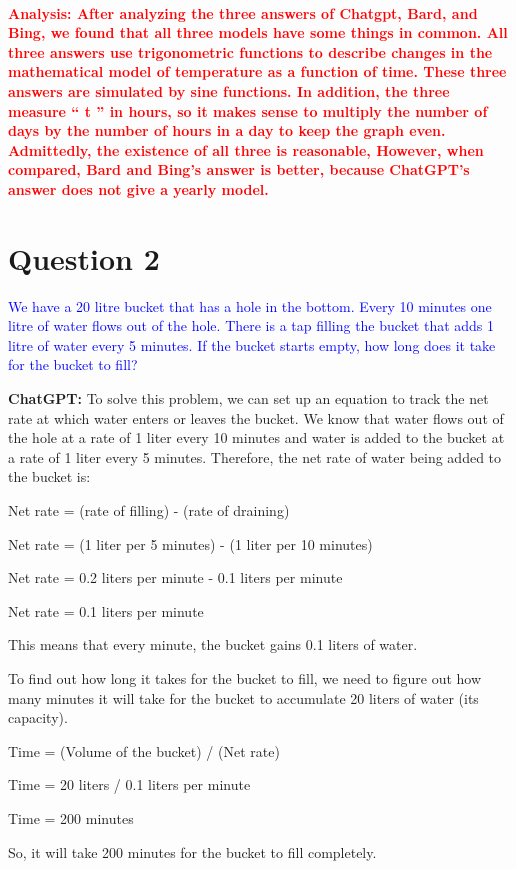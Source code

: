 \documentclass[11pt]{article} %
\begin{document}
\paragraph{\textcolor{red}{Analysis: After analyzing the three answers of Chatgpt, Bard, and Bing, we found that all three models have some things in common. All three answers use trigonometric functions to describe changes in the mathematical model of temperature as a function of time. These three answers are simulated by sine functions. In addition, the three measure “ t ” in hours, so it makes sense to multiply the number of days by the number of hours in a day to keep the graph even. Admittedly, the existence of all three is reasonable, However, when compared, Bard and Bing's answer is better, because ChatGPT's answer does not give a yearly model.}}


\section{Question 2}
\textcolor{blue}{We have a 20 litre bucket that has a hole in the bottom. Every 10 minutes one litre of water flows out of the hole. There is a tap filling the bucket that adds 1 litre of water every 5 minutes. If the bucket starts empty, how long does it take for the bucket to fill?}

\begin{mdframed}[
        backgroundcolor=white,  %
        linecolor=black,        %
        leftmargin=5pt,         %
        rightmargin=5pt,        %
        linewidth=2pt           %
    ]
    \textbf{ChatGPT: } To solve this problem, we can set up an equation to track the net rate at which water enters or leaves the bucket. We know that water flows out of the hole at a rate of 1 liter every 10 minutes and water is added to the bucket at a rate of 1 liter every 5 minutes. Therefore, the net rate of water being added to the bucket is:

    Net rate = (rate of filling) - (rate of draining)

    Net rate = (1 liter per 5 minutes) - (1 liter per 10 minutes)

    Net rate = 0.2 liters per minute - 0.1 liters per minute

    Net rate = 0.1 liters per minute

    This means that every minute, the bucket gains 0.1 liters of water.

    To find out how long it takes for the bucket to fill, we need to figure out how many minutes it will take for the bucket to accumulate 20 liters of water (its capacity).

    Time = (Volume of the bucket) / (Net rate)

    Time = 20 liters / 0.1 liters per minute

    Time = 200 minutes

    So, it will take 200 minutes for the bucket to fill completely.

\end{mdframed}
\end{document}
